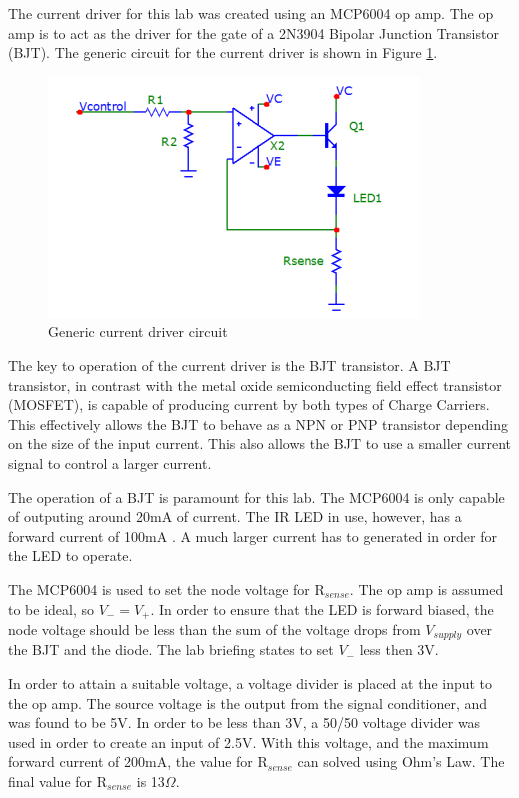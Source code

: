 
The current driver for this lab was created using an MCP6004 op amp. The op amp is to act as the driver for the gate of a 2N3904 Bipolar Junction Transistor (BJT). The generic circuit for the current driver is shown in Figure \ref{fig:currentgeneric}. 
	
	\begin{figure}[H]
		\centering
		\includegraphics[width=.6\textwidth]{CircuitDevelopment/ledgeneric.png}
		\caption{Generic current driver circuit \cite{b2}}
		\label{fig:currentgeneric}
	\end{figure}

The key to operation of the current driver is the BJT transistor. A BJT transistor, in contrast with the metal oxide semiconducting field effect transistor (MOSFET), is capable of producing current by both types of Charge Carriers. This effectively allows the BJT to behave as a NPN or PNP transistor depending on the size of the input current. This also allows the BJT to use a smaller current signal to control a larger current. 

The operation of a BJT is paramount for this lab. The MCP6004 is only capable of outputing around 20mA of current. The IR LED in use, however, has a forward current of 100mA \cite{LEDDATASHEET}. A much larger current has to generated in order for the LED to operate. 

The MCP6004 is used to set the node voltage for R$_{sense}$. The op amp is assumed to be ideal, so $V_- = V_+$. In order to ensure that the LED is forward biased, the node voltage should be less than the sum of the voltage drops from $V_{supply}$ over the BJT and the diode. The lab briefing \cite{b2} states to set $V_-$ less then 3V.

In order to attain a suitable voltage, a voltage divider is placed at the input to the op amp. The source voltage is the output from the signal conditioner, and was found to be 5V. In order to be less than 3V, a 50/50 voltage divider was used in order to create an input of 2.5V. With this voltage, and the maximum forward current of 200mA, the value for R$_{sense}$ can solved using Ohm's Law. The final value for R$_{sense}$ is 13$\Omega$.

